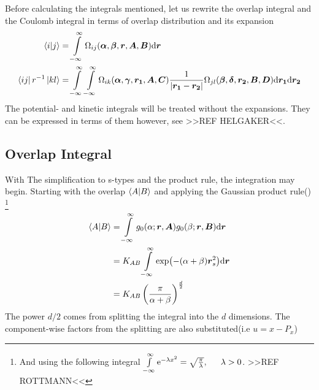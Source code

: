     Before calculating the integrals mentioned, let us rewrite the overlap
    integral and the Coulomb integral in terms of overlap distribution and its
    expansion
        \begin{equation}
            \begin{aligned}
                \braket{i}{j} &= \int\limits^{\infty}_{-\infty}
                \Omega_{ij}(\boldsymbol{{\alpha}},\boldsymbol{{\beta}},\boldsymbol{{r}},
                \boldsymbol{{A}},\boldsymbol{{B}}) \mathrm{d}\boldsymbol{{r}} \\
                \bra{ij}r^{-1}\ket{kl} &= \int\limits^{\infty}_{-\infty}\int\limits^{\infty}_{-\infty}
                \Omega_{ik}(\boldsymbol{{\alpha}},\boldsymbol{{\gamma}},\boldsymbol{{r_1}},
                \boldsymbol{{A}},\boldsymbol{{C}})
                \frac{1}{\abs{\boldsymbol{{r_1}} - \boldsymbol{{r_2}}}}
                \Omega_{jl}(\boldsymbol{{\beta}},\boldsymbol{{\delta}},\boldsymbol{{r_2}},
                \boldsymbol{{B}},\boldsymbol{{D}}) \mathrm{d}\boldsymbol{{r_1}} \mathrm{d}\boldsymbol{{r_2}}
            \end{aligned}
        \end{equation}
    The potential- and kinetic integrals will be treated without the
    expansions.  They can be expressed in terms of them however, see >>REF
    HELGAKER<<.

\subsection{Overlap Integral\label{susec:overlapIntegral}}
    With The simplification to s-types and the product rule, the integration
    may begin. Starting with the overlap $\braket{A}{B}$ and applying the
    Gaussian product rule() \footnote{And using the
    following integral $\infint \me^{-\lambda x^2} =
    \sqrt{\frac{\pi}{\lambda}},\indent \lambda>0$. >>REF ROTTMANN<<}
        \begin{align}
            \braket{A}{B} &= \int\limits^{\infty}_{-\infty} g_0(\alpha;\boldsymbol{{r}},\boldsymbol{{A}})
            g_0(\beta;\boldsymbol{{r}},\boldsymbol{{B}}) \mathrm{d}\boldsymbol{{r}} \nonumber \\
            &= K_{AB}\int\limits^{\infty}_{-\infty} \exp(-(\alpha+\beta)\boldsymbol{{r}}^2_s) \mathrm{d} \boldsymbol{{r}}
            \nonumber \\
            &= K_{AB} \left(\frac{\pi}{\alpha+\beta}\right)^{\frac{d}{2}}
            \label{eq:stypeOverlap}
        \end{align}
    The power $d/2$ comes from splitting the integral into the $d$ dimensions.
    The component-wise factors from the splitting are also substituted(i.e
    $u=x-P_x$)

